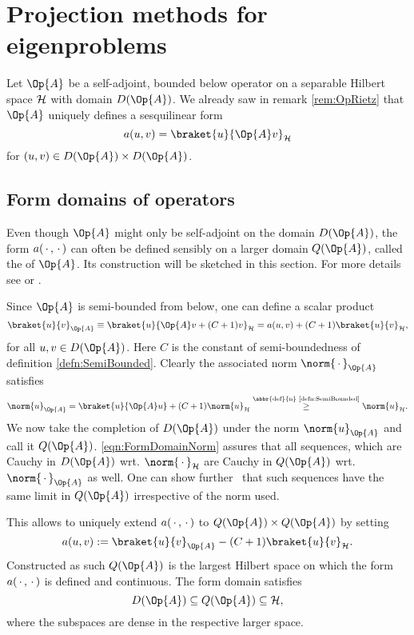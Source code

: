 \section{Projection methods for eigenproblems}
\label{sec:Projection}

Let $\Op{A}$ be a self-adjoint, bounded below operator on a separable Hilbert space
$\mathcal{H}$ with domain $D(\Op{A})$.
We already saw in remark \vref{rem:OpRietz}
that $\Op{A}$ uniquely defines a sesquilinear form
\[ a(u, v) = \braket{u}{\Op{A} v}_\hilbert \]
for $(u, v) \in D(\Op{A}) \times D(\Op{A})$.

\subsection{Form domains of operators}
Even though $\Op{A}$ might only be self-adjoint on the domain $D(\Op{A})$,
the form $a(\,\cdot\,, \,\cdot\,)$ can often be defined sensibly
on a larger domain $Q(\Op{A})$, called the  of $\Op{A}$.
Its construction will be sketched in this section.
For more details see \cite[p. 77]{Teschl2014} or \cite[p. 276]{Reed1980}.

\noindent
Since $\Op{A}$ is semi-bounded from below, one can define a scalar product
\[
	\braket{u}{v}_{\Op{A}} \equiv \braket{u}{\Op{A} v + (C + 1) v}_{\hilbert}
	= a(u, v) + (C+1) \braket{u}{v}_{\hilbert},
\]
for all $u,v \in D(\Op{A})$.
Here $C$ is the constant of semi-boundedness of definition \vref{defn:SemiBounded}.
Clearly the associated norm $\norm{\slot}_{\Op{A}}$ satisfies
\begin{equation}
	\label{eqn:FormDomainNorm}
\norm{u}_{\Op{A}}
= \braket{u}{\Op{A} u} + (C+1) \norm{u}_{\hilbert}
\stackrel{\text{\abbr{def}{n} \ref{defn:SemiBounded}}}{\geq} \norm{u}_{\hilbert}.
\end{equation}
We now take the completion of $D(\Op{A})$ under the norm $\norm{u}_{\Op{A}}$
and call it $Q(\Op{A})$.
\eqref{eqn:FormDomainNorm} assures that all sequences,
which are Cauchy in $D(\Op{A})$ wrt. $\norm{\slot}_{\hilbert}$
are Cauchy in $Q(\Op{A})$ wrt. $\norm{\slot}_{\Op{A}}$ as well.
One can show further~\cite{Teschl2014} that such sequences
have the same limit in $Q(\Op{A})$ irrespective of the norm used.

\noindent
This allows to uniquely
extend $a(\,\cdot\,, \,\cdot\,)$ to $Q(\Op{A}) \times Q(\Op{A})$ by setting
\[ a(u, v) := \braket{u}{v}_{\Op{A}} - (C+1) \braket{u}{v}_{\hilbert}. \]
Constructed as such $Q(\Op{A})$ is the largest Hilbert space on which the form
$a(\,\cdot\,, \,\cdot\,)$ is defined and continuous.
The form domain satisfies
\[ D(\Op{A}) \subseteq Q(\Op{A}) \subseteq \hilbert, \]
where the subspaces are dense in the respective larger space.

